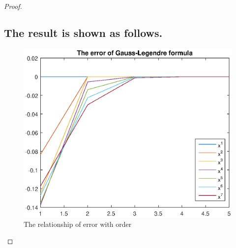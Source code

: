 \documentclass{article}
\newenvironment{problem}[2][Problem]{\begin{trivlist}
\item[\hskip \labelsep {\bfseries #1}\hskip \labelsep {\bfseries #2.}]}{\end{trivlist}}
\begin{document}
\begin{proof}
\subsection{The result is shown as follows.}
\begin{figure}[htbp]
\centering
\includegraphics[width = 15cm]{pic1.eps}
\caption{The relationship of error with order}
\label{Error}
\end{figure}
\end{proof}


\end{document}

